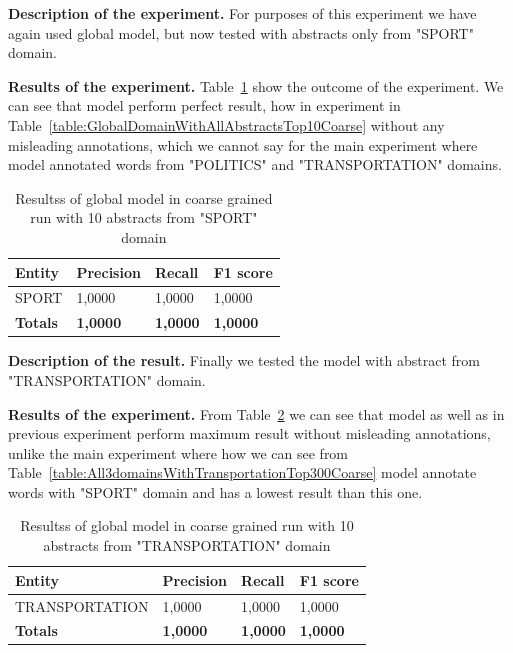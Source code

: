 \documentclass[thesis=M,english]{FITthesis}[2018/05/30]
\begin{document}
	\textbf{Description of the experiment.} For purposes of this experiment we have again used global model, but now tested with abstracts only from "SPORT" domain. 
	
	\textbf{Results of the experiment.} Table~\ref{table:GlobalDomainWithSportTop10Coarse} show the outcome of the experiment. We can see that model perform perfect result, how in experiment in Table~\ref{table:GlobalDomainWithAllAbstractsTop10Coarse} without any misleading annotations, which we cannot say for the main experiment where model annotated words from "POLITICS" and "TRANSPORTATION" domains. 
	
	\begin{table}[H]\centering
		\begin{tabular}{|l|l|l|l|}
			\hline {\textbf{Entity}} & {\textbf{Precision}} & {\textbf{Recall}} & {\textbf{F1 score}}\\\hline
				SPORT & 1,0000 & 1,0000 & 1,0000\\\hline
				\textbf{Totals} & \textbf{1,0000} & \textbf{1,0000} & \textbf{1,0000}\\\hline
		\end{tabular}
		\caption{Resultss of global model in coarse grained run with 10 abstracts from "SPORT" domain \label{table:GlobalDomainWithSportTop10Coarse}}	
	\end{table}	

	\textbf{Description of the result.} Finally we tested the model with abstract from "TRANSPORTATION" domain. 
	
	\textbf{Results of the experiment.} From Table~\ref{table:GlobalDomainWithTransportationTop10Coarse} we can see that model as well as in previous experiment perform maximum result without misleading annotations, unlike the main experiment where how we can see from Table~\ref{table:All3domainsWithTransportationTop300Coarse} model annotate words with "SPORT" domain and has a lowest result than this one.
	
	\begin{table}[H]\centering
		\begin{tabular}{|l|l|l|l|}
			\hline {\textbf{Entity}} & {\textbf{Precision}} & {\textbf{Recall}} & {\textbf{F1 score}}\\\hline
				TRANSPORTATION & 1,0000 & 1,0000 & 1,0000\\\hline
				\textbf{Totals} & \textbf{1,0000} & \textbf{1,0000} & \textbf{1,0000}\\\hline
		\end{tabular}
		\caption{Resultss of global model in coarse grained run with 10 abstracts from "TRANSPORTATION" domain \label{table:GlobalDomainWithTransportationTop10Coarse}}	
	\end{table}
\end{document}
